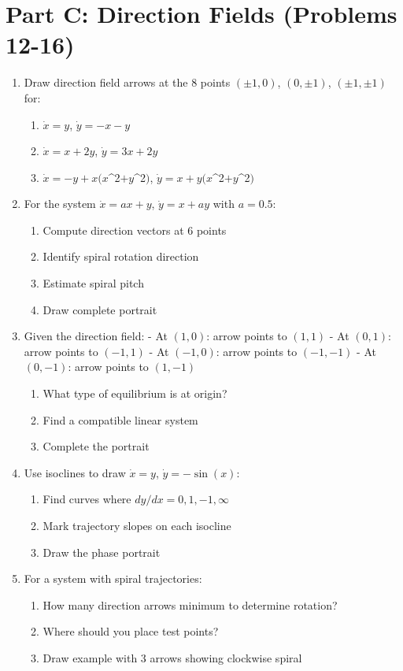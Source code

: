 \documentclass[12pt]{article}
\begin{document}
\section*{Part C: Direction Fields (Problems 12-16)}

\begin{enumerate}[resume]
\item Draw direction field arrows at the 8 points $(\pm1, 0)$, $(0, \pm1)$, $(\pm1, \pm1)$ for:
\begin{enumerate}[label=(\alph*)]
    \item $\dot{x} = y$, $\dot{y} = -x - y$
    \item $\dot{x} = x + 2y$, $\dot{y} = 3x + 2y$
    \item $\dot{x} = -y + x(x$^{2}$ + y$^{2}$)$, $\dot{y} = x + y(x$^{2}$ + y$^{2}$)$
\end{enumerate}

\item For the system $\dot{x} = ax + y$, $\dot{y} = x + ay$ with $a = 0.5$:
\begin{enumerate}[label=(\alph*)]
    \item Compute direction vectors at 6 points
    \item Identify spiral rotation direction
    \item Estimate spiral pitch
    \item Draw complete portrait
\end{enumerate}

\item Given the direction field:
- At $(1,0)$: arrow points to $(1,1)$
- At $(0,1)$: arrow points to $(-1,1)$
- At $(-1,0)$: arrow points to $(-1,-1)$
- At $(0,-1)$: arrow points to $(1,-1)$
\begin{enumerate}[label=(\alph*)]
    \item What type of equilibrium is at origin?
    \item Find a compatible linear system
    \item Complete the portrait
\end{enumerate}

\item Use isoclines to draw $\dot{x} = y$, $\dot{y} = -\sin(x)$:
\begin{enumerate}[label=(\alph*)]
    \item Find curves where $dy/dx = 0, 1, -1, \infty$
    \item Mark trajectory slopes on each isocline
    \item Draw the phase portrait
\end{enumerate}

\item For a system with spiral trajectories:
\begin{enumerate}[label=(\alph*)]
    \item How many direction arrows minimum to determine rotation?
    \item Where should you place test points?
    \item Draw example with 3 arrows showing clockwise spiral
\end{enumerate}
\end{enumerate}
\end{document}
